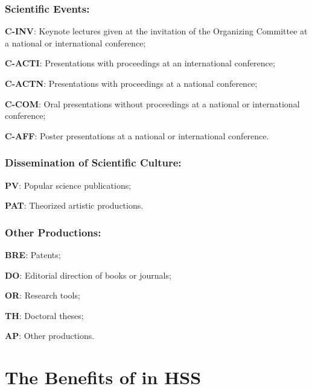 \subsubsection*{Scientific Events:}
    \begin{customitemize}
\item \textbf{C-INV}: Keynote lectures given at the invitation of the Organizing Committee at a national or international conference;
\item \textbf{C-ACTI}: Presentations with proceedings at an international conference;
\item \textbf{C-ACTN}: Presentations with proceedings at a national conference;
\item \textbf{C-COM}: Oral presentations without proceedings at a national or international conference;
\item \textbf{C-AFF}: Poster presentations at a national or international conference.
    \end{customitemize}

\subsubsection*{Dissemination of Scientific Culture:}
    \begin{customitemize}
\item \textbf{PV}: Popular science publications;
\item \textbf{PAT}: Theorized artistic productions.
    \end{customitemize}

\subsubsection*{Other Productions:}
    \begin{customitemize}
\item \textbf{BRE}: Patents;
\item \textbf{DO}: Editorial direction of books or journals;
\item \textbf{OR}: Research tools;
\item \textbf{TH}: Doctoral theses;
\item \textbf{AP}: Other productions.
    \end{customitemize}

\section*{The Benefits of \latexword{\LaTeX} in \acrlong{HSS}
    \label{subbody:interet-latex}
    }

